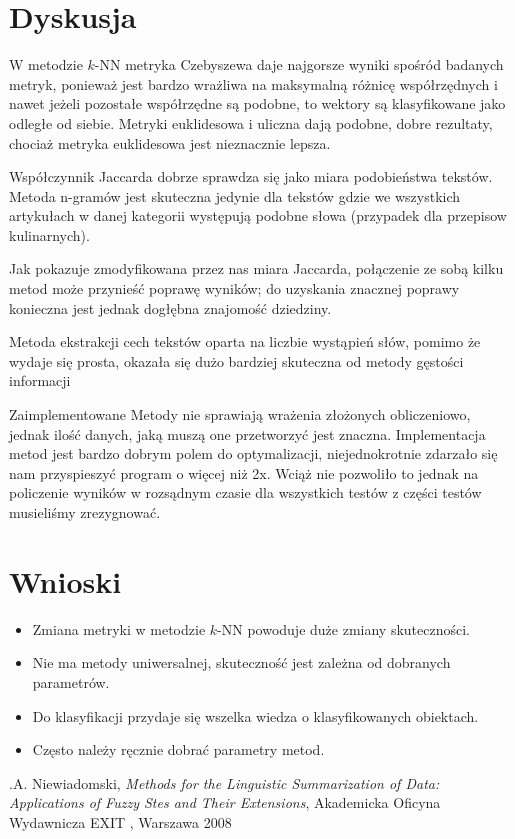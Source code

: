 \documentclass{classrep}
\begin{document}
\section{Dyskusja}
{\color{blue} 
W metodzie $k$-NN metryka Czebyszewa daje najgorsze wyniki spośród badanych metryk, ponieważ jest bardzo wrażliwa na maksymalną różnicę współrzędnych i nawet jeżeli pozostałe współrzędne są podobne, to wektory są klasyfikowane jako odległe od siebie. Metryki euklidesowa i uliczna dają podobne, dobre rezultaty, chociaż metryka euklidesowa jest nieznacznie lepsza.

Współczynnik Jaccarda dobrze sprawdza się jako miara podobieństwa tekstów. Metoda n-gramów jest skuteczna jedynie dla tekstów gdzie we wszystkich artykułach w danej kategorii występują podobne słowa (przypadek dla przepisow kulinarnych).

Jak pokazuje zmodyfikowana przez nas miara Jaccarda, połączenie ze sobą kilku metod może przynieść poprawę wyników; do uzyskania znacznej poprawy konieczna jest jednak dogłębna znajomość dziedziny.

Metoda ekstrakcji cech tekstów oparta na liczbie wystąpień słów, pomimo że wydaje się prosta, okazała się dużo bardziej skuteczna od metody gęstości informacji

Zaimplementowane Metody nie sprawiają wrażenia złożonych obliczeniowo, jednak ilość danych, jaką muszą one przetworzyć jest znaczna. Implementacja metod jest bardzo dobrym polem do optymalizacji, niejednokrotnie zdarzało się nam przyspieszyć program o więcej niż 2x. Wciąż nie pozwoliło to jednak na policzenie wyników w rozsądnym czasie dla wszystkich testów \ppauza z części testów musieliśmy zrezygnować.
}

\section{Wnioski}
{\color{blue} 
\begin{itemize}
 \item Zmiana metryki w metodzie $k$-NN powoduje duże zmiany skuteczności.
 \item Nie ma metody uniwersalnej, skuteczność jest zależna od dobranych parametrów.
 \item Do klasyfikacji przydaje się wszelka wiedza o klasyfikowanych obiektach.
 \item Często należy ręcznie dobrać parametry metod.
\end{itemize}
}

\begin{thebibliography}{0}
\bibitem .A. Niewiadomski, \textsl{Methods for the Linguistic Summarization of Data: Applications of Fuzzy Stes and Their Extensions}, Akademicka Oficyna Wydawnicza EXIT , Warszawa 2008
	
\end{thebibliography}
\end{document}
